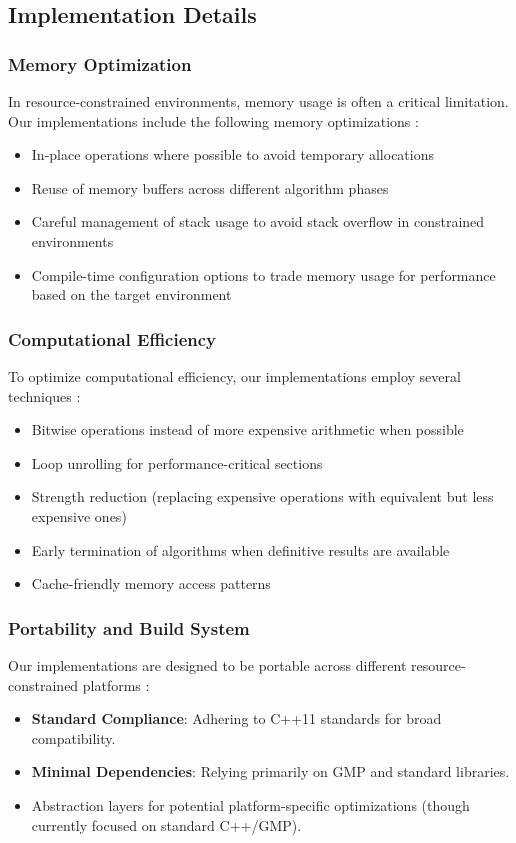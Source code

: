 \subsection{Implementation Details}
\subsubsection{Memory Optimization}
In resource-constrained environments, memory usage is often a critical limitation. Our implementations include the following memory optimizations \cite{iot_survey}:
\begin{itemize}
    \item In-place operations where possible to avoid temporary allocations
    \item Reuse of memory buffers across different algorithm phases
    \item Careful management of stack usage to avoid stack overflow in constrained environments
    \item Compile-time configuration options to trade memory usage for performance based on the target environment
\end{itemize}

\subsubsection{Computational Efficiency}
To optimize computational efficiency, our implementations employ several techniques \cite{energy_efficient}:
\begin{itemize}
    \item Bitwise operations instead of more expensive arithmetic when possible
    \item Loop unrolling for performance-critical sections
    \item Strength reduction (replacing expensive operations with equivalent but less expensive ones)
    \item Early termination of algorithms when definitive results are available
    \item Cache-friendly memory access patterns
\end{itemize}

\subsubsection{Portability and Build System}
Our implementations are designed to be portable across different resource-constrained platforms \cite{embedded_benchmarking}:
\begin{itemize}
    \item \textbf{Standard Compliance}: Adhering to C++11 standards for broad compatibility.
    \item \textbf{Minimal Dependencies}: Relying primarily on GMP and standard libraries.
    \item Abstraction layers for potential platform-specific optimizations (though currently focused on standard C++/GMP).
\end{itemize}

